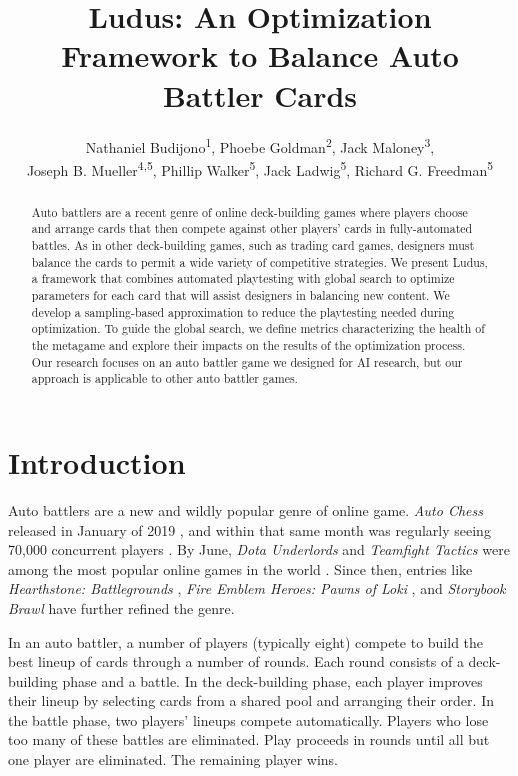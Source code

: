 \documentclass[letterpaper]{article} %
\title{{\sc Ludus}: An Optimization Framework to Balance Auto Battler Cards}
\author {
    Nathaniel Budijono\equalcontrib\textsuperscript{\rm 1},
    Phoebe Goldman\equalcontrib\textsuperscript{\rm 2},
    Jack Maloney\equalcontrib\textsuperscript{\rm 3}, \\
    Joseph B. Mueller\textsuperscript{\rm 4,5},
    Phillip Walker\textsuperscript{\rm 5},
    Jack Ladwig\textsuperscript{\rm 5},
    Richard G. Freedman\textsuperscript{\rm 5}
}
\begin{document}
\maketitle

\begin{abstract}
  Auto battlers are a recent genre of online deck-building games where players choose and arrange cards that then compete against other players' cards in fully-automated battles. As in other deck-building games, such as trading card games, designers must balance the cards to permit a wide variety of competitive strategies.  We present {\sc Ludus}, a framework that combines automated playtesting with global search to optimize parameters for each card that will assist designers in balancing new content.  We develop a sampling-based approximation to reduce the playtesting needed during optimization.  To guide the global search, we define metrics characterizing the health of the metagame and explore their impacts on the results of the optimization process.  Our research focuses on an auto battler game we designed for AI research, but our approach is applicable to other auto battler games.
\end{abstract}

\section{Introduction} \label{sec:introduction}
Auto battlers are a new and wildly popular genre of online game.
\textit{Auto Chess} released in January of 2019 \cite{autochess}, and
within that same month was regularly seeing 70,000 concurrent players
\cite{auto-chess-what-and-why}. By June, \textit{Dota Underlords} and
\textit{Teamfight Tactics} were among the most popular online games in
the world \cite{autobattler-popularity}. Since then, entries like
\textit{Hearthstone: Battlegrounds} \cite{hearthstone-battlegrounds},
\textit{Fire Emblem Heroes: Pawns of Loki} \cite{feh-pawnsOfLoki-video},
and \textit{Storybook Brawl} \cite{storybook-brawl} have further refined the genre.


In an auto battler, a number of players (typically eight) compete to
build the best lineup of cards through a number of rounds. Each round consists of
a deck-building phase and a battle. In the deck-building phase, each
player improves their lineup by selecting cards from a shared pool and arranging their order. In
the battle phase, two players' lineups compete automatically. Players
who lose too many of these battles are eliminated. Play proceeds in
rounds until all but one player are eliminated. The remaining player
wins.
\end{document}
